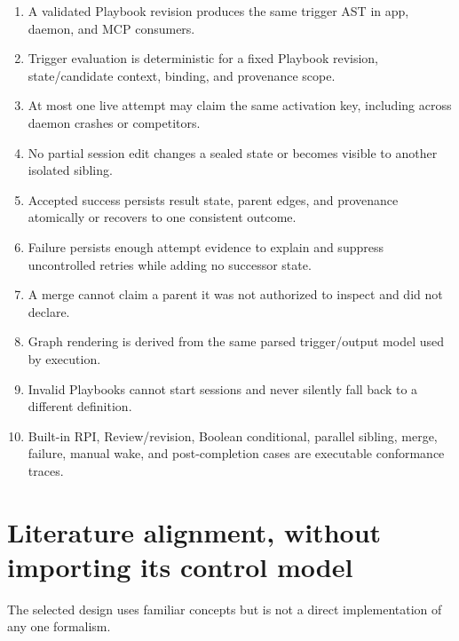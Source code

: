\documentclass[11pt]{article}
\begin{document}
\begin{enumerate}
  \item A validated Playbook revision produces the same trigger AST in app, daemon, and MCP consumers.
  \item Trigger evaluation is deterministic for a fixed Playbook revision, state/candidate context, binding, and provenance scope.
  \item At most one live attempt may claim the same activation key, including across daemon crashes or competitors.
  \item No partial session edit changes a sealed state or becomes visible to another isolated sibling.
  \item Accepted success persists result state, parent edges, and provenance atomically or recovers to one consistent outcome.
  \item Failure persists enough attempt evidence to explain and suppress uncontrolled retries while adding no successor state.
  \item A merge cannot claim a parent it was not authorized to inspect and did not declare.
  \item Graph rendering is derived from the same parsed trigger/output model used by execution.
  \item Invalid Playbooks cannot start sessions and never silently fall back to a different definition.
  \item Built-in RPI, Review/revision, Boolean conditional, parallel sibling, merge, failure, manual wake, and post-completion cases are executable conformance traces.
\end{enumerate}

\section{Literature alignment, without importing its control model}

The selected design uses familiar concepts but is not a direct implementation of any one formalism.
\end{document}
